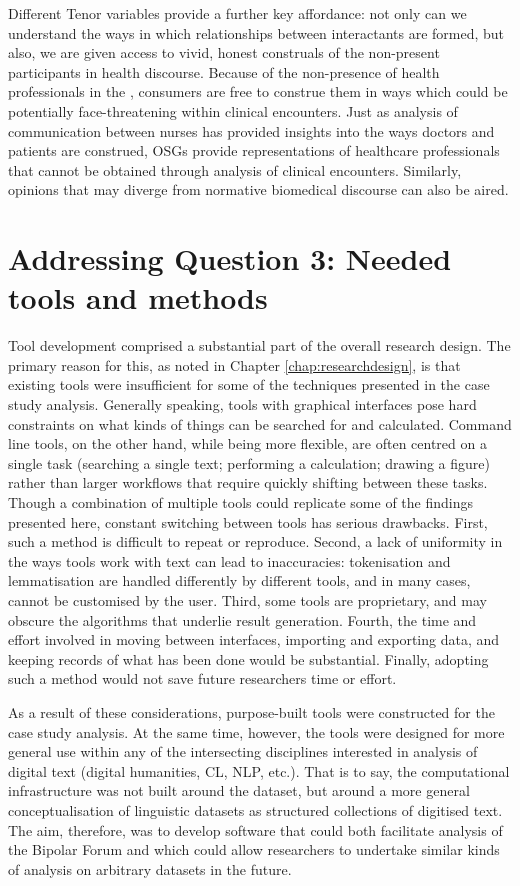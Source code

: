 Different Tenor variables provide a further key affordance: not only can we understand the ways in which relationships between interactants are formed, but also, we are given access to vivid, honest construals of the non-present participants in health discourse. Because of the non-presence of health professionals in the , consumers are free to construe them in ways which could be potentially face\hyp{}threatening within clinical encounters. Just as analysis of communication between nurses has provided insights into the ways doctors and patients are construed, \glspl{OSG} provide representations of healthcare professionals that cannot be obtained through analysis of clinical encounters. Similarly, opinions that may diverge from normative biomedical discourse can also be aired.

\section{Addressing Question 3: Needed tools and methods}

Tool development comprised a substantial part of the overall research design. The primary reason for this, as noted in Chapter \ref{chap:researchdesign}, is that existing tools were insufficient for some of the techniques presented in the case study analysis. Generally speaking, tools with graphical interfaces pose hard constraints on what kinds of things can be searched for and calculated. Command line tools, on the other hand, while being more flexible, are often centred on a single task (searching a single text; performing a calculation; drawing a figure) rather than larger workflows that require quickly shifting between these tasks. Though a combination of multiple tools could replicate some of the findings presented here, constant switching between tools has serious drawbacks. First, such a method is difficult to repeat or reproduce. Second, a lack of uniformity in the ways tools work with text can lead to inaccuracies: tokenisation and lemmatisation are handled differently by different tools, and in many cases, cannot be customised by the user. Third, some tools are proprietary, and may obscure the algorithms that underlie result generation. Fourth, the time and effort involved in moving between interfaces, importing and exporting data, and keeping records of what has been done would be substantial. Finally, adopting such a method would not save future researchers time or effort.

As a result of these considerations, purpose-built tools were constructed for the case study analysis. At the same time, however, the tools were designed for more general use within any of the intersecting disciplines interested in analysis of digital text (digital humanities, \gls{CL}, \gls{NLP}, etc.). That is to say, the computational infrastructure was not built around the dataset, but around a more general conceptualisation of linguistic datasets as structured collections of digitised text. The aim, therefore, was to develop software that could both facilitate analysis of the Bipolar Forum and which could allow researchers to undertake similar kinds of analysis on arbitrary datasets in the future.

